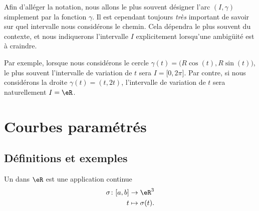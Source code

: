 \newcommand{\CaptionFigExempleArcParam}{Des exemples d'arcs paramétrées. Ceux ne sont pas des graphes.}


\begin{remark}
    Afin d'alléger la notation, nous allons le plus souvent désigner l'arc $(I,\gamma)$ simplement par la fonction $\gamma$. Il est cependant toujours \emph{très} important de savoir sur quel intervalle nous considérons le chemin. Cela dépendra le plus souvent du contexte, et nous indiquerons l'intervalle $I$ explicitement lorsqu'une ambigüité est à craindre.

    Par exemple, lorsque nous considérons le cercle $\gamma(t)=\big( R\cos(t),R\sin(t) \big)$, le plus souvent l'intervalle de variation de $t$ sera $I=\mathopen[ 0 , 2\pi \mathclose]$. Par contre, si nous considérons la droite $\gamma(t)=(t,2t)$, l'intervalle de variation de $t$ sera naturellement $I=\eR$.
\end{remark}

\section{Courbes paramétrés}

\subsection{Définitions et exemples}

\begin{definition}
    Un  dans $\eR$ est une application continue
    \begin{equation}
        \begin{aligned}
            \sigma\colon [a,b]&\to \eR^3 \\
            t&\mapsto \sigma(t). 
        \end{aligned}
    \end{equation}
\end{definition}

